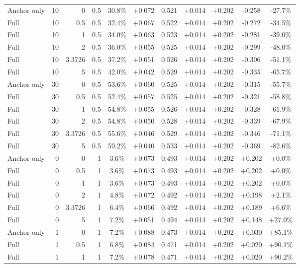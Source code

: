 \begin{table}[htbp]
\begin{tabular}{lrrrccccccc}
Anchor only & 10 & 0 & 0.5 & 30.8\% & +0.072 & 0.521 & +0.014 & +0.202 & -0.258 & -27.7\% \\
Full & 10 & 0.5 & 0.5 & 32.4\% & +0.067 & 0.522 & +0.014 & +0.202 & -0.272 & -34.5\% \\
Full & 10 & 1 & 0.5 & 34.0\% & +0.063 & 0.523 & +0.014 & +0.202 & -0.281 & -39.0\% \\
Full & 10 & 2 & 0.5 & 36.0\% & +0.055 & 0.525 & +0.014 & +0.202 & -0.299 & -48.0\% \\
Full & 10 & 3.3726 & 0.5 & 37.2\% & +0.051 & 0.526 & +0.014 & +0.202 & -0.306 & -51.1\% \\
Full & 10 & 5 & 0.5 & 42.0\% & +0.042 & 0.529 & +0.014 & +0.202 & -0.335 & -65.7\% \\
Anchor only & 30 & 0 & 0.5 & 53.6\% & +0.060 & 0.525 & +0.014 & +0.202 & -0.315 & -55.7\% \\
Full & 30 & 0.5 & 0.5 & 52.4\% & +0.057 & 0.525 & +0.014 & +0.202 & -0.321 & -58.8\% \\
Full & 30 & 1 & 0.5 & 54.8\% & +0.055 & 0.526 & +0.014 & +0.202 & -0.328 & -61.9\% \\
Full & 30 & 2 & 0.5 & 54.8\% & +0.050 & 0.528 & +0.014 & +0.202 & -0.339 & -67.9\% \\
Full & 30 & 3.3726 & 0.5 & 55.6\% & +0.046 & 0.529 & +0.014 & +0.202 & -0.346 & -71.1\% \\
Full & 30 & 5 & 0.5 & 59.2\% & +0.040 & 0.533 & +0.014 & +0.202 & -0.369 & -82.6\% \\
Anchor only & 0 & 0 & 1 & 3.6\% & +0.073 & 0.493 & +0.014 & +0.202 & +0.202 & +0.0\% \\
Full & 0 & 0.5 & 1 & 3.6\% & +0.073 & 0.493 & +0.014 & +0.202 & +0.202 & +0.0\% \\
Full & 0 & 1 & 1 & 3.6\% & +0.073 & 0.493 & +0.014 & +0.202 & +0.202 & +0.0\% \\
Full & 0 & 2 & 1 & 4.8\% & +0.072 & 0.492 & +0.014 & +0.202 & +0.198 & +2.1\% \\
Full & 0 & 3.3726 & 1 & 6.4\% & +0.066 & 0.492 & +0.014 & +0.202 & +0.189 & +6.6\% \\
Full & 0 & 5 & 1 & 7.2\% & +0.051 & 0.494 & +0.014 & +0.202 & +0.148 & +27.0\% \\
Anchor only & 1 & 0 & 1 & 7.2\% & +0.088 & 0.473 & +0.014 & +0.202 & +0.030 & +85.1\% \\
Full & 1 & 0.5 & 1 & 6.8\% & +0.084 & 0.471 & +0.014 & +0.202 & +0.020 & +90.1\% \\
Full & 1 & 1 & 1 & 7.2\% & +0.078 & 0.471 & +0.014 & +0.202 & +0.020 & +90.2\% \\

\end{tabular}
\end{table}
